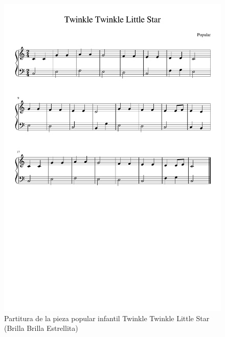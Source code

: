           \begin{figure}
          	\centering
          	\includegraphics[width=0.8\linewidth]{imagenes/scores/Twinkle_Twinkle_Little_Star.pdf}
          	\caption{Partitura de la pieza popular infantil Twinkle Twinkle Little Star (Brilla Brilla Estrellita)}
          \end{figure}
     
